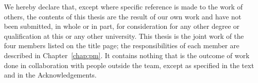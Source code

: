
\begin{declaration}

We hereby declare that, except where specific reference is made to the work of
others, the contents of this thesis are the result of our own work and have not
been submitted, in whole or in part, for consideration for any other degree or
qualification at this or any other university. This thesis is the joint work of
the four members listed on the title page; the responsibilities of each member
are described in Chapter~\ref{chap:pm}. It contains nothing that is the
outcome of work done in collaboration with people outside the team, except as
specified in the text and in the Acknowledgements.

\end{declaration}
